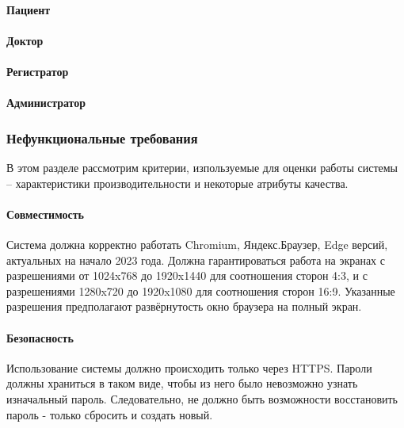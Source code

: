 \documentclass[a4paper,article]{article}
\begin{document}
    \paragraph{Пациент}\label{ТЗ. Пациент}

    \paragraph{Доктор}\label{ТЗ. Доктор}

    \paragraph{Регистратор}\label{ТЗ. Регистратор}

    \paragraph{Администратор}\label{ТЗ. Администратор}

    \newpage

    \subsubsection{Нефункциональные требования}

    В этом разделе рассмотрим критерии, изпользуемые для оценки работы системы -- характеристики производительности и некоторые атрибуты качества.

    \paragraph{Совместимость}\label{ТЗ. Интерфейс пользователя}

    Система должна корректно работать Chromium, Яндекс.Браузер, Edge версий, актуальных на начало 2023 года. Должна гарантироваться работа на экранах с разрешениями от 1024x768 до 1920x1440 для соотношения сторон 4:3, и с разрешениями 1280x720 до 1920x1080 для соотношения сторон 16:9. Указанные разрешения предполагают развёрнутость окно браузера на полный экран.

    \paragraph{Безопасность}\label{ТЗ. Безопасность}

    Использование системы должно происходить только через HTTPS. Пароли должны храниться в таком виде, чтобы из него было невозможно узнать изначальный пароль. Следовательно, не должно быть возможности восстановить пароль - только сбросить и создать новый.
\end{document}
